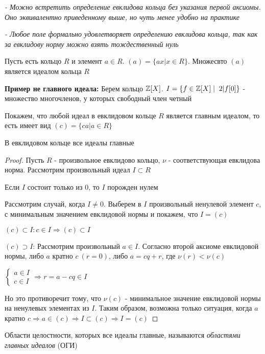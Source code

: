 \begin{normalsize}
    \notice \textit{ - Можно встретить определение евклидова кольца без указания первой аксиомы. Оно эквивалентно
    приведенному выше, но чуть менее удобно на практике}

    \notice \textit{ - Любое поле формально удовлетворяет определению евклидова кольца, так как за евклидову 
    норму можно взять тождественный нуль}
    
    \begin{conj}
        Пусть есть кольцо $R$ и элемент $a \in R$. $(a) = \{ax | x \in R\}$. 
        Множесвто $(a)$ является идеалом кольца $R$
    \end{conj}

    \textbf{Пример не главного идеала: } 
    Берем кольцо $\mathbb{Z}[X]$. $I = \{f \in \mathbb{Z}[X] \mid \; 2| f[0]\}$ -  множество многочленов, 
    у которых свободный член четный

    \qquad Покажем, что любой идеал в евклидовом кольце $R$ является главным идеалом,
    то есть имеет вид $(c) = \{ca|a \in R\}$

    \begin{theorem-non}
        В евклидовом кольце все идеалы главные
    \end{theorem-non}
    \begin{proof}
        Пусть $R$ - произвольное евклидово кольцо, $\nu$ - соответствующая евклидова норма.
        Рассмотрим произвольный идеал $I \subset R$

        Если $I$ состоит только из $0$, то $I$ порожден нулем 

        Рассмотрим случай, когда $I \neq 0$. Выберем в $I$ 
        произвольный ненулевой элемент $c$, с минимальным значением евклидовой нормы и покажем, что $I = (c)$
        
        $(c) \subset I: c \in I \Longrightarrow (c) \subset I$

        $(c) \supset I$: Рассмотрим произвольный $a \in I$. Согласно второй аксиоме евклидовой нормы,
        либо $a$ кратно $c \ (r = 0)$, либо $a = cq + r$, где $\nu(r) < \nu(c)$
        
        $\begin{cases}
            a \in I \\
            c \in I
        \end{cases} \Longrightarrow r = a - cq \in I$

        Но это противоречит тому, что $\nu(c)$ - минимальное значение евклидовой нормы 
        на ненулевых элементах из $I$. Таким образом, возможна только ситуация, когда $a$ кратно $c \Longrightarrow a \in (c) 
        \Longrightarrow I \subset (c) \Longrightarrow I = (c)$ 
    \end{proof}
    \begin{conj}
        Области целостности,  которых все идеалы главные, называются \textit{областями главных идеалов} (ОГИ)       
    \end{conj}
\end{normalsize}